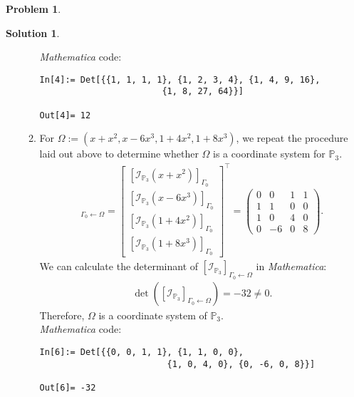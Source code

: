 \documentclass{article}
\theoremstyle{definition}
\newtheorem*{prob*}{Problem}
\newtheorem*{sln*}{Solution}
\begin{document}
\begin{prob*}
\begin{sln*}
\begin{enumerate}
\begin{enumerate}
				\textit{Mathematica} code:
		\begin{lstlisting}
In[4]:= Det[{{1, 1, 1, 1}, {1, 2, 3, 4}, {1, 4, 9, 16}, 
						{1, 8, 27, 64}}]
				
Out[4]= 12
		\end{lstlisting}
		
		
		
		
		
		
				\item For $\Omega := (x+x^2,x-6x^3,1+4x^2,1+8x^3)$, we repeat the procedure laid out above to determine whether $\Omega$ is a coordinate system for $\mathbb{P}_3$. 
				\begin{align*}
				[\mathcal{I}_{\mathbb{P}_3}]_{\Gamma_0\leftarrow\Omega}
				= \begin{bmatrix}
				[\mathcal{I}_{\mathbb{P}_3}(x+x^2)]_{\Gamma_0} \\ [\mathcal{I}_{\mathbb{P}_3}(x-6x^3)]_{\Gamma_0} \\ [\mathcal{I}_{\mathbb{P}_3}(1+4x^2)]_{\Gamma_0} \\ [\mathcal{I}_{\mathbb{P}_3}(1+8x^3)]_{\Gamma_0}
				\end{bmatrix}^\top
				= \begin{pmatrix}
				0&0&1&1\\
				1&1&0&0\\
				1&0&4&0\\
				0&-6&0&8
				\end{pmatrix}. 
				\end{align*} 
				We can calculate the determinant of $[\mathcal{I}_{\mathbb{P}_3}]_{\Gamma_0\leftarrow\Omega}$ in \textit{Mathematica}:
				\begin{align*}
				\det\left( [\mathcal{I}_{\mathbb{P}_3}]_{\Gamma_0\leftarrow\Omega}  \right) = -32 \neq 0.
				\end{align*}
				Therefore, $\Omega$ is a coordinate system of $\mathbb{P}_3$.\\
				
				\textit{Mathematica} code:
				\begin{lstlisting}
In[6]:= Det[{{0, 0, 1, 1}, {1, 1, 0, 0},
						 {1, 0, 4, 0}, {0, -6, 0, 8}}]
				
Out[6]= -32
				\end{lstlisting}
				
			\end{enumerate}
		
		
		

\end{enumerate}
\end{sln*}
\end{prob*}
\end{document}
